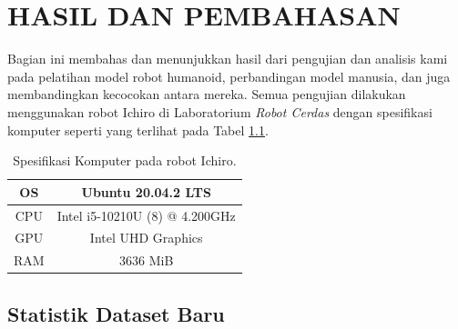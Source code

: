 \chapter{HASIL DAN PEMBAHASAN}
\label{chap:resultsandiscussion}


Bagian ini membahas dan menunjukkan hasil dari pengujian dan analisis kami pada pelatihan model robot humanoid, perbandingan model manusia, dan juga membandingkan kecocokan antara mereka.
Semua pengujian dilakukan menggunakan robot Ichiro di Laboratorium \emph{Robot Cerdas} dengan spesifikasi komputer seperti yang terlihat pada Tabel \ref{tb:computerspecichiro}.

\def\arraystretch{1.5}
\begin{longtable}{|c|c|}
  \caption{Spesifikasi Komputer pada robot Ichiro.}
  \label{tb:computerspecichiro}\\
  \hline
  OS      & Ubuntu 20.04.2 LTS \\
  \hline
  CPU     & Intel i5-10210U (8) @ 4.200GHz \\
  \hline
  GPU     & Intel UHD Graphics  \\
  \hline
  RAM     & 3636 MiB \\
  \hline
\end{longtable}


\section{Statistik Dataset Baru}
\label{sec:new-dataset-statistics}

